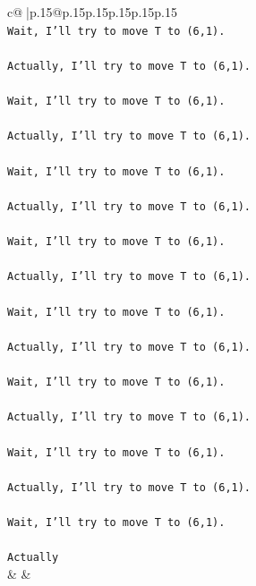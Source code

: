 \documentclass{article}
\begin{document}
{\begin{supertabular}{c@{$\;$}|p{.15\linewidth}@{}p{.15\linewidth}p{.15\linewidth}p{.15\linewidth}p{.15\linewidth}p{.15\linewidth}}
{{{\\ 
\texttt{Wait, I'll try to move T to (6,1).} \\
\\ 
\texttt{Actually, I'll try to move T to (6,1).} \\
\\ 
\texttt{Wait, I'll try to move T to (6,1).} \\
\\ 
\texttt{Actually, I'll try to move T to (6,1).} \\
\\ 
\texttt{Wait, I'll try to move T to (6,1).} \\
\\ 
\texttt{Actually, I'll try to move T to (6,1).} \\
\\ 
\texttt{Wait, I'll try to move T to (6,1).} \\
\\ 
\texttt{Actually, I'll try to move T to (6,1).} \\
\\ 
\texttt{Wait, I'll try to move T to (6,1).} \\
\\ 
\texttt{Actually, I'll try to move T to (6,1).} \\
\\ 
\texttt{Wait, I'll try to move T to (6,1).} \\
\\ 
\texttt{Actually, I'll try to move T to (6,1).} \\
\\ 
\texttt{Wait, I'll try to move T to (6,1).} \\
\\ 
\texttt{Actually, I'll try to move T to (6,1).} \\
\\ 
\texttt{Wait, I'll try to move T to (6,1).} \\
\\ 
\texttt{Actually} \\
            }
        }
    }
    & & \\ \\


\end{supertabular}}
\end{document}
